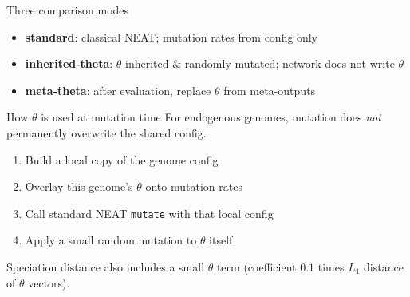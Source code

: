 \documentclass[aspectratio=169,11pt]{beamer}
\begin{document}
\begin{frame}{Three comparison modes}
  \begin{center}
  \end{center}

  \vspace{0.8em}
  \begin{itemize}
    \item \textbf{standard}: classical NEAT; mutation rates from config only
    \item \textbf{inherited-theta}: $\theta$ inherited \& randomly mutated; network does not write $\theta$
    \item \textbf{meta-theta}: after evaluation, replace $\theta$ from meta-outputs
  \end{itemize}
\end{frame}

\begin{frame}{How $\theta$ is used at mutation time}
  For endogenous genomes, mutation does \emph{not} permanently overwrite the shared config.

  \vspace{0.5em}
  \begin{enumerate}
    \item Build a local copy of the genome config
    \item Overlay this genome's $\theta$ onto mutation rates
    \item Call standard NEAT \texttt{mutate} with that local config
    \item Apply a small random mutation to $\theta$ itself
  \end{enumerate}

  \vspace{0.5em}
  Speciation distance also includes a small $\theta$ term
  (coefficient $0.1$ times $L_1$ distance of $\theta$ vectors).
\end{frame}
\end{document}
